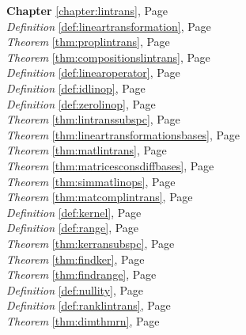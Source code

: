 \begin{multicols}{3}
\begin{center}
      \textbf{Chapter} \ref{chapter:lintrans}, Page \pageref{chapter:lintrans} \\
      \textit{Definition} \ref{def:lineartransformation}, Page \pageref{def:lineartransformation} \\
      \textit{Theorem} \ref{thm:proplintrans}, Page \pageref{thm:proplintrans} \\
      \textit{Theorem} \ref{thm:compositionslintrans}, Page \pageref{thm:compositionslintrans} \\
      \textit{Definition} \ref{def:linearoperator}, Page \pageref{def:linearoperator} \\
      \textit{Definition} \ref{def:idlinop}, Page \pageref{def:idlinop} \\
      \textit{Definition} \ref{def:zerolinop}, Page \pageref{def:zerolinop} \\
      \textit{Theorem} \ref{thm:lintranssubspc}, Page \pageref{thm:lintranssubspc} \\
      \textit{Theorem} \ref{thm:lineartransformationsbases}, Page \pageref{thm:lineartransformationsbases} \\
      \textit{Theorem} \ref{thm:matlintrans}, Page \pageref{thm:matlintrans} \\
      \textit{Theorem} \ref{thm:matricesconsdiffbases}, Page \pageref{thm:matricesconsdiffbases} \\
      \textit{Theorem} \ref{thm:simmatlinops}, Page \pageref{thm:simmatlinops} \\
      \textit{Theorem} \ref{thm:matcomplintrans}, Page \pageref{thm:matcomplintrans} \\
      \textit{Definition} \ref{def:kernel}, Page \pageref{def:kernel} \\
      \textit{Definition} \ref{def:range}, Page \pageref{def:range} \\
      \textit{Theorem} \ref{thm:kerransubspc}, Page \pageref{thm:kerransubspc} \\
      \textit{Theorem} \ref{thm:findker}, Page \pageref{thm:findker} \\
      \textit{Theorem} \ref{thm:findrange}, Page \pageref{thm:findrange} \\
      \textit{Definition} \ref{def:nullity}, Page \pageref{def:nullity} \\
      \textit{Definition} \ref{def:ranklintrans}, Page \pageref{def:ranklintrans} \\
      \textit{Theorem} \ref{thm:dimthmrn}, Page \pageref{thm:dimthmrn} \\

\end{center}
\end{multicols}
